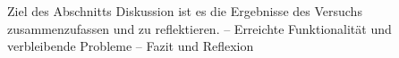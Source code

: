 Ziel des Abschnitts Diskussion ist es die Ergebnisse des Versuchs zusammenzufassen und zu reflektieren.
–	Erreichte Funktionalität und verbleibende Probleme
–	Fazit und Reflexion